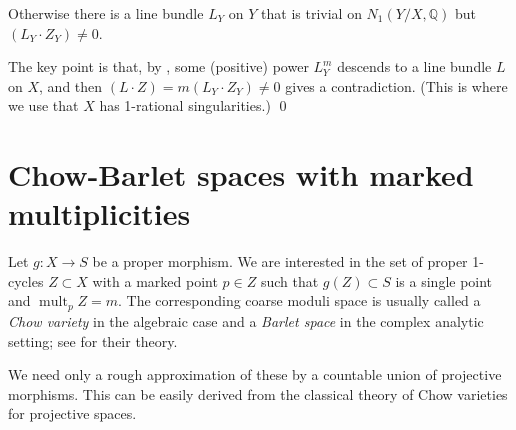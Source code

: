 \documentclass{amsart}
\theoremstyle{definition}
\theoremstyle{remark}
\newcommand{\q}[0]{{\mathbb Q}}
\newcommand{\mult}[0]{\operatorname{mult}}
\begin{document}
Otherwise there is a line bundle $L_Y$ on $Y$ that is
trivial on $N_1(Y/X,\q)$ but  $(L_Y\cdot Z_Y)\neq 0$. 

The key point is that, by \cite[12.1.4]{km-flips}, 
some (positive) power  $L_Y^m$ descends to  a line bundle $L$ on $X$, and then  $(L\cdot Z)=m(L_Y\cdot Z_Y)\neq 0$ gives a  contradiction. 
(This is where we use that $X$ has 1-rational singularities.) \qed


\section{Chow-Barlet spaces with marked multiplicities}

  Let $g:X\to S$ be a proper morphism. We are interested in the 
  set of proper 1-cycles $Z\subset X$ with a marked point $p\in Z$ such that $g(Z)\subset S$ is a single point and $\mult_pZ=m$.
  The corresponding coarse moduli space is usually called a
  {\it Chow variety}  in the  algebraic case
  and a {\it Barlet space} in the complex analytic setting; see 
  \cite{bar-mag} for their theory.

  We need only a rough approximation of these by a countable union of projective morphisms. This can be easily derived from the classical theory of Chow varieties for projective spaces.
  

 
\end{document}
